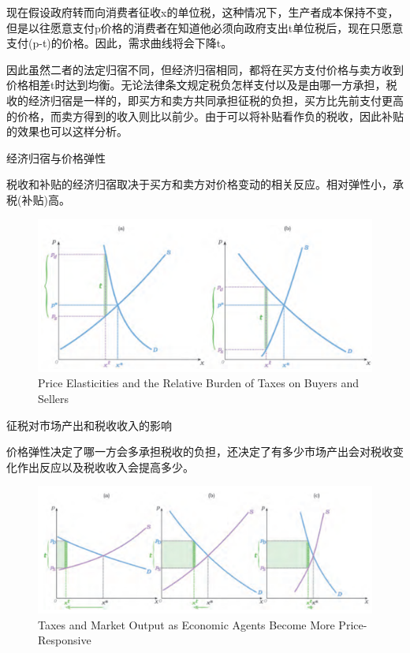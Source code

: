 \documentclass{article}
\begin{document}
现在假设政府转而向消费者征收x的单位税，这种情况下，生产者成本保持不变，但是以往愿意支付p价格的消费者在知道他必须向政府支出t单位税后，现在只愿意支付(p-t)的价格。因此，需求曲线将会下降t。

因此虽然二者的法定归宿不同，但经济归宿相同，都将在买方支付价格与卖方收到价格相差t时达到均衡。无论法律条文规定税负怎样支付以及是由哪一方承担，税收的经济归宿是一样的，即买方和卖方共同承担征税的负担，买方比先前支付更高的价格，而卖方得到的收入则比以前少。由于可以将补贴看作负的税收，因此补贴的效果也可以这样分析。


\hspace*{\fill}

经济归宿与价格弹性

税收和补贴的经济归宿取决于买方和卖方对价格变动的相关反应。相对弹性小，承税(补贴)高。

\hspace*{\fill}

\begin{figure}[H] %
	\centering %
	\includegraphics[width=1\textwidth]{19_2} %
	\caption{Price Elasticities and the Relative Burden of Taxes on Buyers and Sellers} %
	\label{Fig.main3} %
\end{figure}

\hspace*{\fill}

征税对市场产出和税收收入的影响

价格弹性决定了哪一方会多承担税收的负担，还决定了有多少市场产出会对税收变化作出反应以及税收收入会提高多少。


\begin{figure}[H] %
	\centering %
	\includegraphics[width=1\textwidth]{19_3} %
	\caption{Taxes and Market Output as Economic Agents Become More Price-Responsive} %
	\label{Fig.main4} %
\end{figure}
\end{document}
